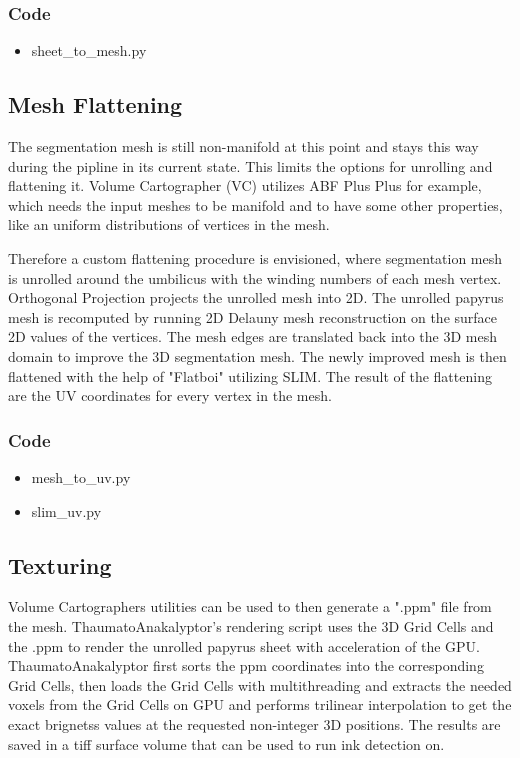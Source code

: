 \documentclass[peerreview]{IEEEtran}
\begin{document}
\subsubsection{Code}
\begin{itemize}
    \item sheet\_to\_mesh.py
\end{itemize}

\subsection{Mesh Flattening}
The segmentation mesh is still non-manifold at this point and stays this way during the pipline in its current state. This limits the options for unrolling and flattening it. Volume Cartographer (VC) utilizes ABF Plus Plus for example, which needs the input meshes to be manifold and to have some other properties, like an uniform distributions of vertices in the mesh.

Therefore a custom flattening procedure is envisioned, where segmentation mesh is unrolled around the umbilicus with the winding numbers of each mesh vertex. Orthogonal Projection projects the unrolled mesh into 2D. The unrolled papyrus mesh is recomputed by running 2D Delauny mesh reconstruction on the surface 2D values of the vertices. The mesh edges are translated back into the 3D mesh domain to improve the 3D segmentation mesh. The newly improved mesh is then flattened with the help of "Flatboi" utilizing SLIM. The result of the flattening are the UV coordinates for every vertex in the mesh.

\subsubsection{Code}
\begin{itemize}
    \item mesh\_to\_uv.py
    \item slim\_uv.py
\end{itemize}

\subsection{Texturing}
Volume Cartographers utilities can be used to then generate a ".ppm" file from the mesh.
ThaumatoAnakalyptor's rendering script uses the 3D Grid Cells and the .ppm to render the unrolled papyrus sheet with acceleration of the GPU.
ThaumatoAnakalyptor first sorts the ppm coordinates into the corresponding Grid Cells, then loads the Grid Cells with multithreading and extracts the needed voxels from the Grid Cells on GPU and performs trilinear interpolation to get the exact brignetss values at the requested non-integer 3D positions.
The results are saved in a tiff surface volume that can be used to run ink detection on.
\end{document}
